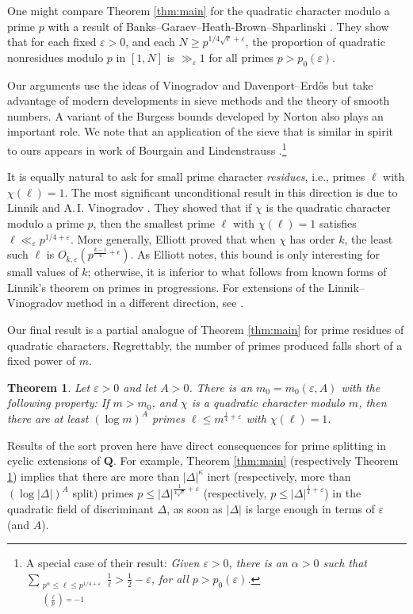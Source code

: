 \documentclass{scrartcl}
\theoremstyle{plain}
\newtheorem{thm}{Theorem}[section]
\theoremstyle{remark}
\newcommand{\1}{\mathbf{1}}
\newcommand{\Q}{\mathbf{Q}}
\newcommand\leg{\genfrac(){.4pt}{}}
\begin{document}
One might compare Theorem \ref{thm:main} for the quadratic character modulo a prime $p$ with a result of Banks--Garaev--Heath-Brown--Shparlinski \cite{BGHBS08}. They show that for each fixed $\varepsilon > 0$, and each $N \ge p^{1/4\sqrt{e}+\varepsilon}$, the proportion of quadratic nonresidues modulo $p$ in $[1,N]$ is $\gg_{\varepsilon} 1$ for all primes $p > p_0(\varepsilon)$.

Our arguments use the ideas of Vinogradov and Davenport--Erd\H{o}s but take advantage of modern developments in sieve methods and the theory of smooth numbers. A variant of the Burgess bounds developed by Norton also plays an important role. We note that an application of the sieve that is similar in spirit to ours appears in work of Bourgain and Lindenstrauss \cite[Theorem 5.1]{BL03}.\footnote{A special case of their result: \emph{Given $\varepsilon >0$, there is an $\alpha>0$ such that $\sum_{\substack{p^{\alpha} \le \ell \le p^{1/4+\varepsilon} \\ \leg{\ell}{p}=-1}}\frac{1}{\ell} > \frac{1}{2}-\varepsilon$, for all $p > p_0(\varepsilon)$.}}

It is equally natural to ask for small prime character \emph{residues}, i.e., primes $\ell$ with $\chi(\ell)=1$. The most significant unconditional result in this direction is due to Linnik and A.\,I. Vinogradov \cite{VL66}. They showed that if $\chi$ is the quadratic character modulo a prime $p$, then the smallest prime $\ell$ with $\chi(\ell)=1$ satisfies $\ell \ll_{\varepsilon} p^{1/4+\varepsilon}$. More generally, Elliott \cite{elliott71} proved that when $\chi$ has order $k$, the least such $\ell$ is $O_{k,\varepsilon}(p^{\frac{k-1}{4}+\epsilon})$. As Elliott notes, this bound is only interesting for small values of $k$; otherwise, it is inferior to what follows from known forms of Linnik's theorem on primes in progressions. For extensions of the Linnik--Vinogradov method in a different direction, see \cite{pollack14B, pollack14}.

Our final result is a partial analogue of Theorem \ref{thm:main} for prime residues of quadratic characters. Regrettably, the number of primes produced falls short of a fixed power of $m$.

\begin{thm}\label{thm:smallresidue} Let $\varepsilon > 0$ and let $A >0$. There is an $m_0=m_0(\varepsilon,A)$ with the following property: If $m > m_0$, and $\chi$ is a quadratic character modulo $m$, then there are at least $(\log{m})^{A}$ primes $\ell \le m^{\frac{1}{4}+\varepsilon}$ with $\chi(\ell)=1$.
\end{thm}
Results of the sort proven here have direct consequences for prime splitting in cyclic extensions of $\Q$. For example, Theorem \ref{thm:main} (respectively Theorem \ref{thm:smallresidue}) implies that there are more than $|\Delta|^{\kappa}$ inert (respectively, more than $(\log|\Delta|)^{A}$ split) primes $p \le |\Delta|^{\frac{1}{4\sqrt{e}}+\varepsilon}$ (respectively, $p \le |\Delta|^{\frac{1}{4}+\varepsilon}$) in the quadratic field of discriminant $\Delta$, as soon as $|\Delta|$ is large enough in terms of $\varepsilon$ (and $A$).
\end{document}
